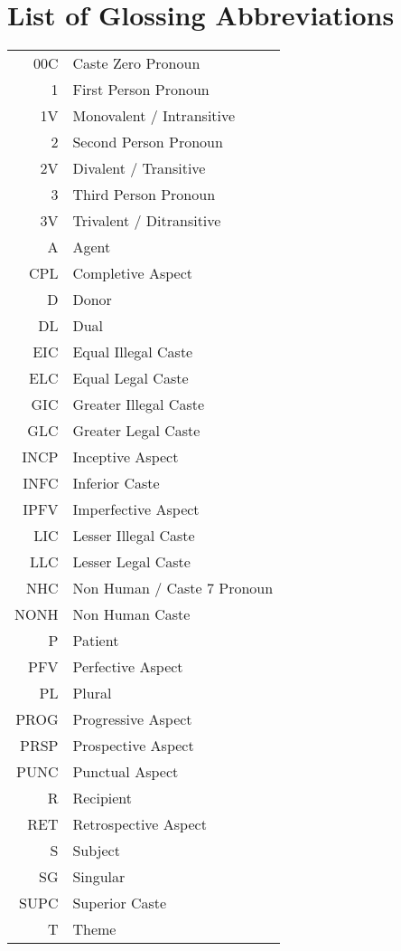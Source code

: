 \chapter{List of Glossing Abbreviations}

\begin{tabu}{r | X[l]}
    00C & Caste Zero Pronoun \\
    1 & First Person Pronoun \\
    1V & Monovalent / Intransitive \\
    2 & Second Person Pronoun \\
    2V & Divalent / Transitive \\
    3 & Third Person Pronoun \\
    3V & Trivalent / Ditransitive \\
    A & Agent \\
    CPL & Completive Aspect \\
    D & Donor \\
    DL & Dual \\
    EIC & Equal Illegal Caste \\
    ELC & Equal Legal Caste \\
    GIC & Greater Illegal Caste \\
    GLC & Greater Legal Caste \\
    INCP & Inceptive Aspect \\
    INFC & Inferior Caste \\
    IPFV & Imperfective Aspect \\
    LIC & Lesser Illegal Caste \\
    LLC & Lesser Legal Caste \\
    NHC & Non Human / Caste 7 Pronoun \\
    NONH & Non Human Caste \\
    P & Patient \\
    PFV & Perfective Aspect \\
    PL & Plural \\
    PROG & Progressive Aspect \\
    PRSP & Prospective Aspect \\
    PUNC & Punctual Aspect \\
    R & Recipient \\
    RET & Retrospective Aspect \\
    S & Subject \\
    SG & Singular \\
    SUPC & Superior Caste \\
    T & Theme
\end{tabu}